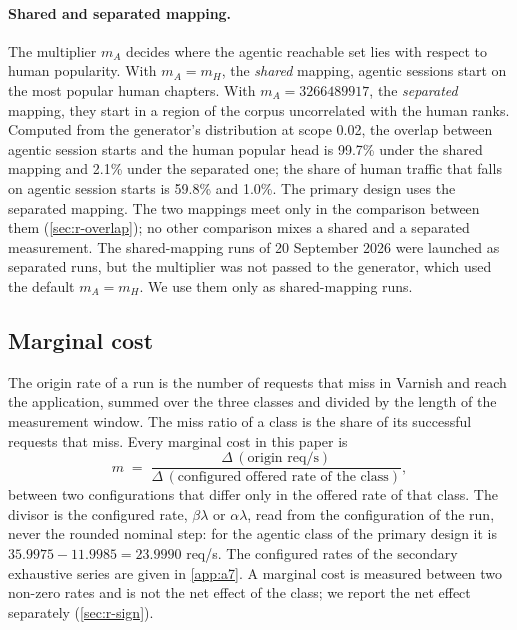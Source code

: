 \paragraph{Shared and separated mapping.}
The multiplier $m_A$ decides where the agentic reachable set lies with respect to human
popularity.
With $m_A = m_H$, the \emph{shared} mapping, agentic sessions start on the most popular
human chapters.
With $m_A = 3266489917$, the \emph{separated} mapping, they start in a region of the
corpus uncorrelated with the human ranks.
Computed from the generator's distribution at scope 0.02, the overlap between agentic
session starts and the human popular head is 99.7\% under the shared mapping and 2.1\%
under the separated one; the share of human traffic that falls on agentic session starts
is 59.8\% and 1.0\%.
The primary design uses the separated mapping.
The two mappings meet only in the comparison between them (\cref{sec:r-overlap}); no
other comparison mixes a shared and a separated measurement.
The shared-mapping runs of 20 September 2026 were launched as separated runs, but the
multiplier was not passed to the generator, which used the default $m_A = m_H$.
We use them only as shared-mapping runs.

\subsection{Marginal cost}\label{sec:m-marginal}
The origin rate of a run is the number of requests that miss in Varnish and reach the
application, summed over the three classes and divided by the length of the measurement
window.
The miss ratio of a class is the share of its successful requests that miss.
Every marginal cost in this paper is
\begin{equation}\label{eq:marginal}
  m \;=\; \frac{\Delta\,(\text{origin req/s})}{\Delta\,(\text{configured offered rate of the class})},
\end{equation}
between two configurations that differ only in the offered rate of that class.
The divisor is the configured rate, $\beta\lambda$ or $\alpha\lambda$, read from the
configuration of the run, never the rounded nominal step: for the agentic class of the
primary design it is $35.9975 - 11.9985 = 23.9990$ req/s.
The configured rates of the secondary exhaustive series are given in \cref{app:a7}.
A marginal cost is measured between two non-zero rates and is not the net effect of the
class; we report the net effect separately (\cref{sec:r-sign}).

